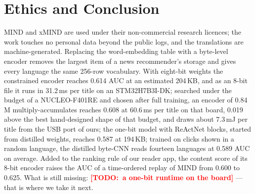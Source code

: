 \documentclass{llncs}
\newcommand{\TODO}[1]{\textcolor{red}{\textbf{[TODO:\ #1]}}}
\begin{document}
\section{Ethics and Conclusion}
MIND and xMIND are used under their non-commercial research licences; the work
touches no personal data beyond the public logs, and the translations are
machine-generated. Replacing the word-embedding table with a byte-level encoder
removes the largest item of a news recommender's storage and gives every language
the same 256-row vocabulary. With eight-bit weights the constrained encoder
reaches 0.614 AUC at an estimated 204\,KB, and as an 8-bit file it runs in
31.2\,ms per title on an STM32H7B3I-DK; searched under the budget of a
NUCLEO-F401RE and chosen after full training, an encoder of 0.84\,M
multiply-accumulates reaches 0.608 at 60.6\,ms per title on that board, 0.019
above the best hand-designed shape of that budget, and draws about 7.3\,mJ per
title from the USB port of ours; the one-bit model with ReActNet blocks,
started from distilled weights, reaches 0.587 at 194\,KB; trained on clicks shown in a random
language, the distilled byte-CNN reads fourteen languages at 0.589 AUC on average.
Added to the ranking rule of our reader app, the content score of its 8-bit
encoder raises the AUC of a time-ordered replay of MIND from 0.600 to 0.625.
What is still missing: \TODO{a one-bit runtime on the board}
--- that is where we take it next.



\end{document}
